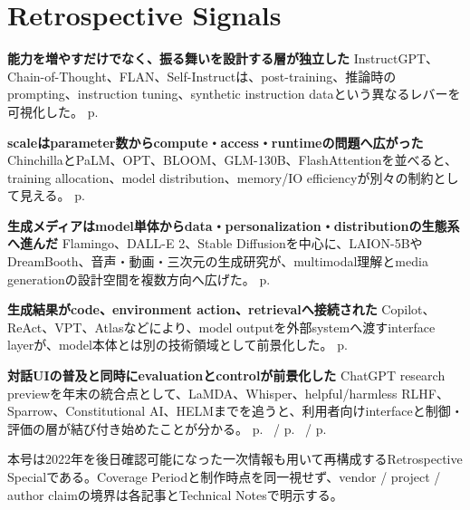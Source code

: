 \section*{Retrospective Signals}
\smallskip
\noindent\textbf{能力を増やすだけでなく、振る舞いを設計する層が独立した} InstructGPT、Chain-of-Thought、FLAN、Self-Instructは、post-training、推論時のprompting、instruction tuning、synthetic instruction dataという異なるレバーを可視化した。 \hfill{\footnotesize p.~\pageref{pkg:steering-reasoning}}\par
\smallskip
\noindent\textbf{scaleはparameter数からcompute・access・runtimeの問題へ広がった} ChinchillaとPaLM、OPT、BLOOM、GLM-130B、FlashAttentionを並べると、training allocation、model distribution、memory/IO efficiencyが別々の制約として見える。 \hfill{\footnotesize p.~\pageref{pkg:scale-access-systems}}\par
\smallskip
\noindent\textbf{生成メディアはmodel単体からdata・personalization・distributionの生態系へ進んだ} Flamingo、DALL-E 2、Stable Diffusionを中心に、LAION-5BやDreamBooth、音声・動画・三次元の生成研究が、multimodal理解とmedia generationの設計空間を複数方向へ広げた。 \hfill{\footnotesize p.~\pageref{pkg:multimodal-media}}\par
\smallskip
\noindent\textbf{生成結果がcode、environment action、retrievalへ接続された} Copilot、ReAct、VPT、Atlasなどにより、model outputを外部systemへ渡すinterface layerが、model本体とは別の技術領域として前景化した。 \hfill{\footnotesize p.~\pageref{pkg:code-action-retrieval}}\par
\smallskip
\noindent\textbf{対話UIの普及と同時にevaluationとcontrolが前景化した} ChatGPT research previewを年末の統合点として、LaMDA、Whisper、helpful/harmless RLHF、Sparrow、Constitutional AI、HELMまでを追うと、利用者向けinterfaceと制御・評価の層が結び付き始めたことが分かる。 \hfill{\footnotesize p.~\pageref{pkg:dialogue-interface-control} / p.~\pageref{pkg:evaluation-layer} / p.~\pageref{pkg:annual-synthesis}}\par
\medskip
\begin{claimboundary}
本号は2022年を後日確認可能になった一次情報も用いて再構成するRetrospective Specialである。Coverage Periodと制作時点を同一視せず、vendor / project / author claimの境界は各記事とTechnical Notesで明示する。
\end{claimboundary}
\medskip
\tableofcontents
